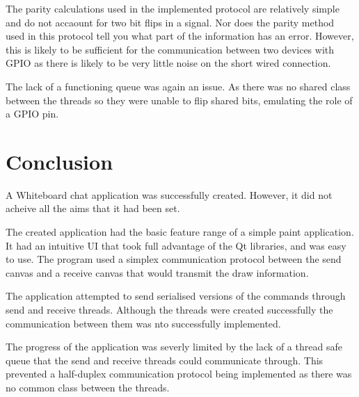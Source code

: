 \documentclass[10pt]{article}
\begin{document}
\begin{multicols*}{2}
The parity calculations used in the implemented protocol are relatively simple and do not accaount for two bit flips in a signal. Nor does the parity method used in this protocol tell you what part of the information has an error. However, this is likely to be sufficient for the communication between two devices with GPIO as there is likely to be very little noise on the short wired connection.

The lack of a functioning queue was again an issue. As there was no shared class between the threads so they were unable to flip shared bits, emulating the role of a GPIO pin.

\section{Conclusion}
A Whiteboard chat application was successfully created. However, it did not acheive all the aims that it had been set.

The created application had the basic feature range of a simple paint application. It had an intuitive UI that took full advantage of the Qt libraries, and was easy to use. The program used a simplex communication protocol between the send canvas and a receive canvas that would transmit the draw information.

The application attempted to send serialised versions of the commands through send and receive threads. Although the threads were created successfully the communication between them was nto successfully implemented.

The progress of the application was severly limited by the lack of a thread safe queue that the send and receive threads could communicate through. This prevented a half-duplex communication protocol being implemented as there was no common class between the threads.


\nocite{*} %



\end{multicols*}
\end{document}
